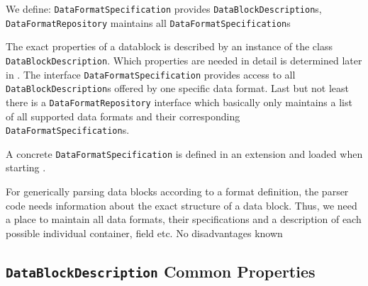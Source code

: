 We define:
{%
\texttt{DataFormatSpecification} provides \texttt{DataBlockDescription}s, \texttt{DataFormatRepository} maintains all \texttt{DataFormatSpecification}s
}
{%
The exact properties of a datablock is described by an instance of the class \texttt{DataBlockDescription}. Which properties are needed in detail is determined later in .
The interface \texttt{DataFormatSpecification} provides access to all \texttt{DataBlockDescription}s offered by one specific data format. Last but not least there is a \texttt{DataFormatRepository} interface which basically only maintains a list of all supported data formats and their corresponding \texttt{DataFormatSpecification}s.

A concrete \texttt{DataFormatSpecification} is defined in an extension and loaded when starting \LibName{}. 
}
{%
For generically parsing data blocks according to a format definition, the parser code needs information about the exact structure of a data block. Thus, we need a place to maintain all data formats, their specifications and a description of each possible individual container, field etc.
}
{%
No disadvantages known
}

\subsection{\texttt{DataBlockDescription} Common Properties}%
\label{sec:DatablockProperties}%

